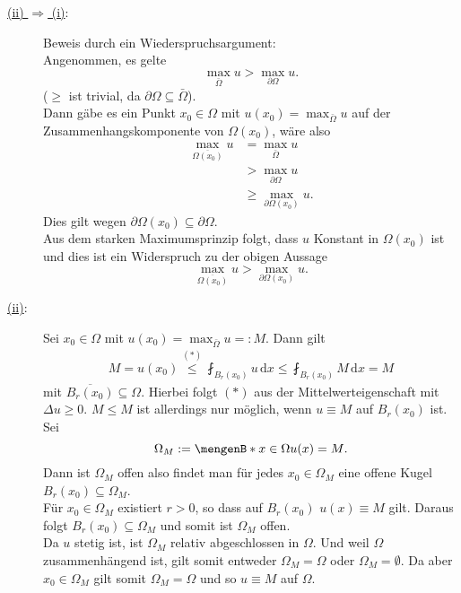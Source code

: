 \begin{beweis}
	\begin{description}
		\item[\underline{(ii) $\Rightarrow$ (i)}:] Beweis durch ein Wiederspruchsargument: \\
		Angenommen, es gelte 
		\begin{equation}
			\max_{\bar{\Omega}}u > \max_{\partial \Omega} u.
		\end{equation}
		($\geq$ ist trivial, da $\partial \Omega \subseteq \bar{\Omega}$). \\
		Dann gäbe es ein Punkt $x_0 \in \Omega$ mit $u(x_0) = \max_{\bar{\Omega}}u$ auf der Zusammenhangskomponente von $\Omega(x_0)$, wäre also
		\begin{align*}
			\max_{\overline{\Omega(x_0)}}u &= \max_{\bar{\Omega}}u \\
			&> \max_{\partial \Omega}u \\
			&\geq  \max_{ \partial \Omega(x_0)}u.
		\end{align*}
		Dies gilt wegen $ \partial \Omega(x_0) \subseteq \partial \Omega$. \\
		Aus dem starken Maximumsprinzip folgt, dass $u$ Konstant in $\Omega(x_0)$ ist und dies ist ein Widerspruch zu der obigen Aussage
		\[
			\max_{\overline{\Omega(x_0)}}u > \max_{\partial \Omega(x_0)} u.
		\]
		\item[\underline{(ii)}:] Sei $x_0 \in \Omega$ mit $u(x_0) = \max_{\bar{\Omega}}u =: M$. Dann gilt
		\begin{align*}
			M = u(x_0) \stackrel{(*)}{\leq } \fint_{B_r(x_0)}^{} u \,\mathrm{d}x \leq  \fint_{B_r(x_0)}^{} M \,\mathrm{d}x = M 
		\end{align*}
		mit $\overline{B_r(x_0)} \subseteq \Omega$. Hierbei folgt $(*)$ aus der Mittelwerteigenschaft mit $ \Delta u \geq 0$. $M \leq M$ ist allerdings nur möglich, 
		wenn $u \equiv M$ auf $B_r(x_0)$ ist. Sei
		\[
			\Omega_M := \set[x \in \Omega]{u(x)=M}.
		\]
		Dann ist $\Omega_M$ offen also findet man für jedes $x_0 \in \Omega_M$ eine offene Kugel $B_r(x_0) \subseteq \Omega_M$. \\
		Für $x_0 \in \Omega_M$ existiert $r>0$, so dass auf $B_r(x_0)$ $u(x) \equiv M$ gilt. 
		Daraus folgt $B_r(x_0) \subseteq  \Omega_M$ und somit ist $\Omega_M$ offen. \\
		Da $u$ stetig ist, ist $\Omega_M$ relativ abgeschlossen in $\Omega$. 
		Und weil $\Omega$ zusammenhängend ist, gilt somit entweder $\Omega_M = \Omega$ oder $\Omega_M = \emptyset$.
		Da aber $x_0 \in \Omega_M$ gilt somit $\Omega_M = \Omega$ und so $u \equiv M$ auf $\Omega$.
	\end{description}
\end{beweis}

